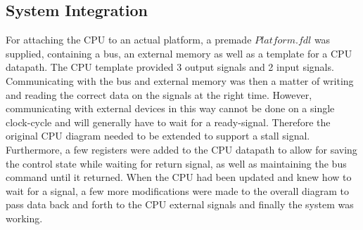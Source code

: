 \documentclass[12pt,a4paper]{article}
\begin{document}
\subsection{System Integration}
	For attaching the CPU to an actual platform, a premade $Platform.fdl$ was supplied, containing a bus, an external memory as well as a template for a CPU datapath. The CPU template provided 3 output signals and 2 input signals. Communicating with the bus and external memory was then a matter of writing and reading the correct data on the signals at the right time. However, communicating with external devices in this way cannot be done on a single clock-cycle and will generally have to wait for a ready-signal. Therefore the original CPU diagram needed to be extended to support a stall signal. 
Furthermore, a few registers were added to the CPU datapath to allow for saving the control state while waiting for return signal, as well as maintaining the bus command until it returned.
	When the CPU had been updated and knew how to wait for a signal, a few more modifications were made to the overall diagram to pass data back and forth to the CPU external signals and finally the system was working.
	
\end{document}
